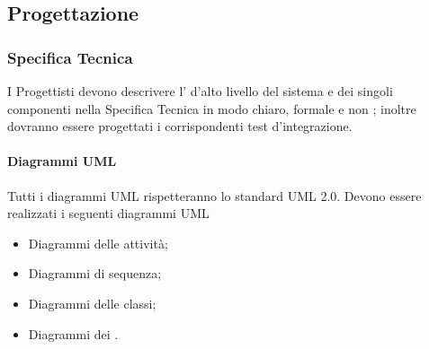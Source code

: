 \subsection{Progettazione}
\label{}
\subsubsection{Specifica Tecnica}
\label{}
I Progettisti devono descrivere l' d'alto livello del sistema e dei singoli componenti nella Specifica Tecnica in modo chiaro, formale e non ; inoltre dovranno essere progettati i corrispondenti test d'integrazione.

\paragraph{Diagrammi UML}
\label{}
Tutti i diagrammi UML rispetteranno lo standard UML 2.0.
Devono essere realizzati i seguenti diagrammi UML
\begin{itemize}
\item Diagrammi delle attività;
\item Diagrammi di sequenza;
\item Diagrammi delle classi;
\item Diagrammi dei .
\end{itemize}

